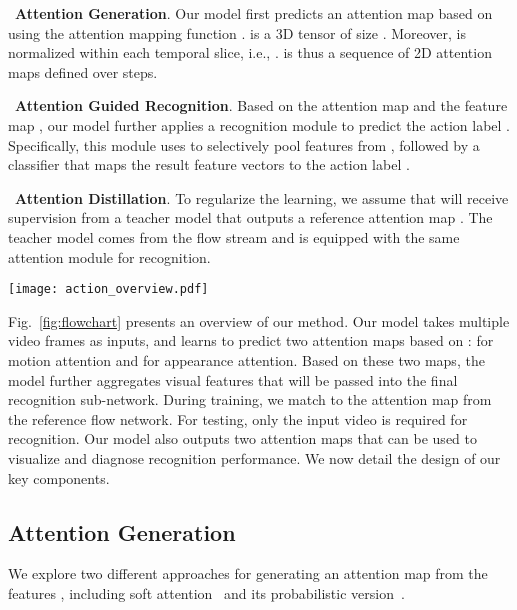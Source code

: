 \documentclass{bmvc2k}
\begin{document}
\noindent \textbullet\ \textbf{Attention Generation}. Our model first predicts an attention map  based on  using the attention mapping function .  is a 3D tensor of size . Moreover,  is normalized within each temporal slice, i.e., .  is thus a sequence of 2D attention maps  defined over  steps. 

\noindent \textbullet\ \textbf{Attention Guided Recognition}. Based on the attention map  and the feature map , our model further applies a recognition module  to predict the action label . Specifically, this module uses  to selectively pool features from , followed by a classifier that maps the result feature vectors to the action label .

\noindent \textbullet\ \textbf{Attention Distillation}. To regularize the learning, we assume that  will receive supervision from a teacher model that outputs a reference attention map . The teacher model comes from the flow stream and is equipped with the same attention module for recognition.

\begin{figure*}[t]
\centering
\texttt{[image: action\_overview.pdf]}
\caption{Overview of our method. Our model (c) takes multiple RGB frames as inputs and adopts a 3D convolutional network as the backbone. It outputs two attention maps using the attention module (b), based on which the action labels are predicted. The motion map is learned by mimicking the attention from a reference flow network (a). The appearance map is learned to highlight discriminative regions for recognition. These two maps are used to create spatio-temporal feature representations from video frames for action recognition.}
\label{fig:flowchart}
\end{figure*}
Fig.\ \ref{fig:flowchart} presents an overview of our method. Our model takes multiple video frames  as inputs, and learns to predict two attention maps based on :  for motion attention and  for appearance attention. Based on these two maps, the model further aggregates visual features that will be passed into the final recognition sub-network. During training, we match  to the attention map  from the reference flow network. For testing, only the input video is required for recognition. Our model also outputs two attention maps that can be used to visualize and diagnose recognition performance. We now detail the design of our key components.

\subsection{Attention Generation}
We explore two different approaches for generating an attention map from the features , including soft attention~\cite{wang2017residual} and its probabilistic version~\cite{Li_2018_ECCV}.
\end{document}
